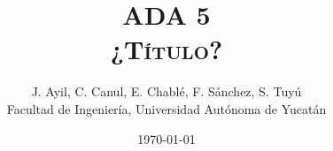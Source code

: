 \documentclass[12pt, final]{extarticle}
\title{ADA 5\\
\textsc{¿Título?}}
\author{J. Ayil, C. Canul, E. Chablé, F. Sánchez, S. Tuyú\\
{Facultad de Ingeniería, Universidad Autónoma de Yucatán}}
\date{\today}
\begin{document}
\maketitle

\begin{abstract}
    \blindtext
\end{abstract}

\nocite{*}
\vfill


\end{document}
